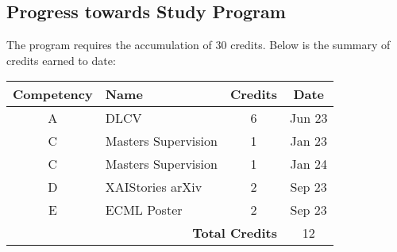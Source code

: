 \subsection*{Progress towards Study Program}
The program requires the accumulation of 30 credits. Below is the summary of credits earned to date:

\begin{tabular}{|c|l|c|c|}
    \hline
    \textbf{Competency} & \textbf{Name}             & \textbf{Credits} & \textbf{Date}   \\ \hline
    A                   & DLCV                      & 6                & Jun 23         \\ \hline
    C                   & Masters Supervision       & 1                & Jan 23        \\ \hline
    C                   & Masters Supervision       & 1                & Jan 24        \\ \hline
    D                   & XAIStories arXiv          & 2                & Sep 23        \\ \hline
    E        & ECML Poster      & 2       & Sep 23 \\ \hline
    \multicolumn{3}{|r|}{\textbf{Total Credits}}   & 12               \\ \hline
\end{tabular}